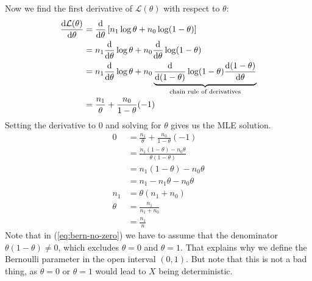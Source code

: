 Now we find the first derivative of $\mathcal L(\theta)$ with respect to $\theta$:
\begin{subequations}
\begin{align}
	\dv{\mathcal L(\theta)}{\theta} &= \dv{\theta} \left[ n_1 \log \theta + n_0 \log (1-\theta) \right] \\
	 &= n_1 \dv{\theta} \log \theta + n_0 \dv{\theta} \log (1-\theta) \\
	 &= n_1 \dv{\theta} \log \theta + n_0 \underbrace{\dv{(1-\theta)} \log (1-\theta) \dv{(1-\theta)}{\theta}}_{\text{chain rule of derivatives}}\\
	 &= \frac{n_1}{\theta} + \frac{n_0}{1-\theta}(-1) 
\end{align}
\end{subequations}
Setting the derivative to $0$ and solving for $\theta$ gives us the MLE solution.
\begin{subequations}
\begin{align}
	0 &= \frac{n_1}{\theta} + \frac{n_0}{1-\theta}(-1)\\	
	 &= \frac{n_1 (1 - \theta) - n_0 \theta}{\theta(1-\theta)} \label{eq:bern-no-zero}\\
	 &= n_1 (1 - \theta) - n_0 \theta\\
	 &= n_1 - n_1 \theta - n_0 \theta\\
	n_1 &= \theta(n_1 + n_0)\\
	\theta &= \frac{n_1}{n_1 + n_0}  \\
	&= \frac{n_1}{n}
\end{align}
\end{subequations}
Note that in (\ref{eq:bern-no-zero}) we have to assume that the denominator $\theta(1-\theta) \neq 0$, which excludes $\theta=0$ and $\theta=1$. That explains why we define the Bernoulli parameter in the open interval $(0, 1)$. But note that this is not a bad thing, as $\theta=0$ or $\theta=1$ would lead to $X$ being deterministic. 